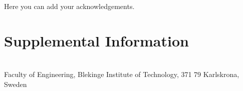 \documentclass[a4paper,twoside]{bth}
\newcommand{\faculty}{Engineering}
\begin{document}
\acknowledgments %
\noindent
Here you can add your acknowledgements.

\cleardoublepage


\setcounter{secnumdepth}{3} %
\tableofcontents
\listoffigures             %

\cleardoublepage
\pagestyle{headings}
\printglossaries














\appendix
\chapter{Supplemental Information}


\cleardoublepage
\thispagestyle{empty}
\vspace*{\fill}
\clearpage{\thispagestyle{empty}}
\changepage{3cm}{1cm}{-0.5cm}{-0.5cm}{}{-1.5cm}{}{}{}
\vspace*{\fill}
\center

{\bthcsnotextlogo{3cm}}
\\
\noindent\makebox[\linewidth]{\rule{\textwidth}{1pt}} 
Faculty of \faculty, Blekinge Institute of Technology, 371 79 Karlskrona, Sweden
\end{document}
